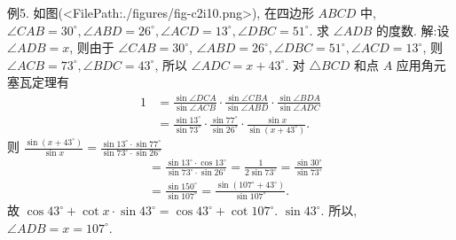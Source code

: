 例5. 如图(<FilePath:./figures/fig-c2i10.png>), 在四边形 $A B C D$ 中, $\angle C A B=30^{\circ}, \angle A B D=26^{\circ}, \angle A C D=13^{\circ}, \angle D B C= 51^{\circ}$. 求 $\angle A D B$ 的度数.
解:设 $\angle A D B=x$, 则由于 $\angle C A B=30^{\circ}$, $\angle A B D=26^{\circ}, \angle D B C=51^{\circ}, \angle A C D=13^{\circ}$, 则 $\angle A C B=73^{\circ}, \angle B D C=43^{\circ}$, 所以 $\angle A D C=x+43^{\circ}$.
对 $\triangle B C D$ 和点 $A$ 应用角元塞瓦定理有
$$
\begin{aligned}
1 & =\frac{\sin \angle D C A}{\sin \angle A C B} \cdot \frac{\sin \angle C B A}{\sin \angle A B D} \cdot \frac{\sin \angle B D A}{\sin \angle A D C} \\
& =\frac{\sin 13^{\circ}}{\sin 73^{\circ}} \cdot \frac{\sin 77^{\circ}}{\sin 26^{\circ}} \cdot \frac{\sin x}{\sin \left(x+43^{\circ}\right)} .
\end{aligned}
$$
则 $\frac{\sin \left(x+43^{\circ}\right)}{\sin x}=\frac{\sin 13^{\circ} \cdot \sin 77^{\circ}}{\sin 73^{\circ} \cdot \sin 26^{\circ}}$
$$
\begin{aligned}
& =\frac{\sin 13^{\circ} \cdot \cos 13^{\circ}}{\sin 73^{\circ} \cdot \sin 26^{\circ}}=\frac{1}{2 \sin 73^{\circ}}=\frac{\sin 30^{\circ}}{\sin 73^{\circ}} \\
& =\frac{\sin 150^{\circ}}{\sin 107^{\circ}}=\frac{\sin \left(107^{\circ}+43^{\circ}\right)}{\sin 107^{\circ}} .
\end{aligned}
$$
故 $\cos 43^{\circ}+\cot x \cdot \sin 43^{\circ}=\cos 43^{\circ}+\cot 107^{\circ}$. $\sin 43^{\circ}$.
所以, $\angle A D B=x=107^{\circ}$.



